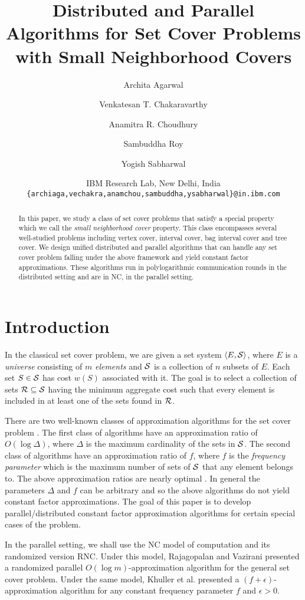 \documentclass[11pt]{article}
\title{Distributed and Parallel Algorithms for Set Cover Problems with Small Neighborhood Covers}
\author{Archita Agarwal \and Venkatesan T. Chakaravarthy \and Anamitra R. Choudhury \and Sambuddha Roy \and Yogish Sabharwal}
\date{IBM Research Lab, New Delhi, India\\
  \texttt{\{archiaga,vechakra,anamchou,sambuddha,ysabharwal\}@in.ibm.com}
}
\newcommand{\calS} {{\cal S}}
\newcommand{\calR} {{\cal R}}
\newcommand{\pair}[2] {\langle #1, #2\rangle}
\begin{document}
\maketitle

\begin{abstract}
In this paper, we study a class of set cover problems that satisfy a special property which 
we call the {\em small neighborhood cover} property.
This class encompasses several well-studied problems including vertex cover, interval cover, 
bag interval cover and tree cover. We design unified distributed and parallel algorithms that can handle 
any set cover problem falling under the above framework and yield constant factor approximations.
These algorithms run in polylogarithmic communication rounds in the distributed setting
and are in NC, in the parallel setting.
\end{abstract}

\section{Introduction}
In the classical set cover problem, we are given a set system $\pair{E}{\calS}$,
where $E$ is a {\em universe} consisting of $m$ {\em elements}
and $\calS$ is a collection of $n$ subsets of $E$.
Each set $S\in \calS$ has cost $w(S)$ associated with it.
The goal is to select a collection of sets $\calR\subseteq \calS$
having the minimum aggregate cost such that every element is included in at least one
of the sets found in $\calR$.

There are two well-known classes of approximation algorithms for the set cover problem \cite{ShmoysBook}.
The first class of algorithms have an approximation ratio of $O(\log \Delta)$,
where $\Delta$ is the maximum cardinality of the sets in $\calS$.
The second class of algorithms have an approximation ratio of $f$,
where $f$ is the {\em frequency parameter} which is the maximum number of sets of $\calS$
that any element belongs to. 
The above approximation ratios are nearly optimal \cite{Hypergraph-Hardness, RazS97, Feige}. 
In general the parameters $\Delta$ and $f$ can be arbitrary and so the above algorithms do not yield
constant factor approximations.
The goal of this paper is to develop parallel/distributed constant factor approximation algorithms
for certain special cases of the problem.

In the parallel setting, we shall use the NC model of computation and its randomized version RNC.
Under this model, Rajagopalan and Vazirani \cite{RV} presented a randomized 
parallel $O(\log m)$-approximation algorithm for the general set cover problem.
Under the same model, Khuller et al. \cite{KVY} presented a $(f+\epsilon)$-approximation algorithm
for any constant frequency parameter $f$ and $\epsilon>0$.
\end{document}

